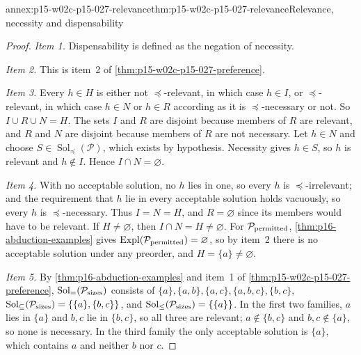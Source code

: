 \begin{annexitem}{annex:p15-w02c-p15-027-relevance}{thm:p15-w02c-p15-027-relevance}{Relevance, necessity and dispensability}
\begin{proof}
\emph{Item 1.} Dispensability is defined as the negation of necessity.

\emph{Item 2.} This is item~2 of \cref{thm:p15-w02c-p15-027-preference}.

\emph{Item 3.} Every \(h\in H\) is either not \(\preceq\)-relevant, in
which case \(h\in I\), or \(\preceq\)-relevant, in which case \(h\in N\) or
\(h\in R\) according as it is \(\preceq\)-necessary or not. So
\(I\cup R\cup N=H\). The sets \(I\) and \(R\) are disjoint because members
of \(R\) are relevant, and \(R\) and \(N\) are disjoint because members of
\(R\) are not necessary. Let \(h\in N\) and choose
\(S\in\operatorname{Sol}_{\preceq}(\mathcal P)\), which exists by
hypothesis. Necessity gives \(h\in S\), so \(h\) is relevant and
\(h\notin I\). Hence \(I\cap N=\varnothing\).

\emph{Item 4.} With no acceptable solution, no \(h\) lies in one, so every
\(h\) is \(\preceq\)-irrelevant; and the requirement that \(h\) lie in every
acceptable solution holds vacuously, so every \(h\) is
\(\preceq\)-necessary. Thus \(I=N=H\), and \(R=\varnothing\) since its
members would have to be relevant. If \(H\ne\varnothing\), then
\(I\cap N=H\ne\varnothing\). For \(\mathcal P_{\rm permitted}\),
\cref{thm:p16-abduction-examples} gives
\(\operatorname{Expl}(\mathcal P_{\rm permitted})=\varnothing\), so by
item~2 there is no acceptable solution under any preorder, and
\(H=\{a\}\ne\varnothing\).

\emph{Item 5.} By \cref{thm:p16-abduction-examples} and item~1 of
\cref{thm:p15-w02c-p15-027-preference},
\(\operatorname{Sol}_{=}(\mathcal P_{\rm sizes})\) consists of
\(\{a\},\{a,b\},\{a,c\},\{a,b,c\},\{b,c\}\),
\(\operatorname{Sol}_{\subseteq}(\mathcal P_{\rm sizes})=\{\{a\},\{b,c\}\}\),
and \(\operatorname{Sol}_{\le}(\mathcal P_{\rm sizes})=\{\{a\}\}\). In the
first two families, \(a\) lies in \(\{a\}\) and \(b,c\) lie in \(\{b,c\}\),
so all three are relevant; \(a\notin\{b,c\}\) and \(b,c\notin\{a\}\), so
none is necessary. In the third family the only acceptable solution is
\(\{a\}\), which contains \(a\) and neither \(b\) nor \(c\).
\end{proof}
\end{annexitem}

